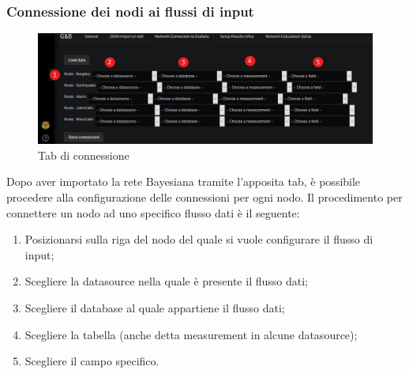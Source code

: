 \subsubsection{Connessione dei nodi ai flussi di input}
\begin{figure} [H]
	\centering
	\includegraphics[scale=0.55]{Img/configurazionerete} 
	\caption{Tab di connessione} \label{} 
\end{figure} 
Dopo aver importato la rete Bayesiana tramite l'apposita tab, è possibile procedere alla configurazione delle connessioni per ogni nodo.
Il procedimento per connettere un nodo ad uno specifico flusso dati è il seguente:
\begin{enumerate}
	\item Posizionarsi sulla riga del nodo del quale si vuole configurare il flusso di input;
	\item Scegliere la datasource nella quale è presente il flusso dati;
	\item Scegliere il database al quale appartiene il flusso dati;
	\item Scegliere la tabella (anche detta measurement in alcune datasource);
	\item Scegliere il campo specifico.
\end{enumerate}